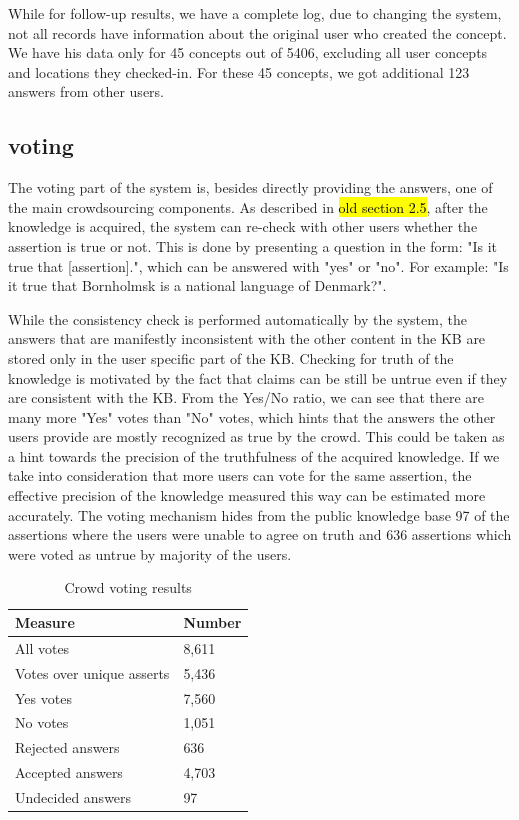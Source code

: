 {While for follow-up results, we have a complete log, due to changing the 
system, not all records have information about the original user who created 
the concept. We have his data only for 45 concepts out of 5406, excluding all 
user concepts and locations they checked-in. For these 45 concepts, 
we got additional 123 answers from other users.

\subsection{voting}
\label{section:resultsvoting}
The voting part of the system is, besides directly providing the answers, 
one of the main crowdsourcing components. As described in \hl{old section 2.5}, 
after the knowledge is acquired, the system can re-check with other users 
whether the assertion is true or not. This is done by presenting a question in 
the form: "Is it true that [assertion].", which can be answered with "yes" or 
"no". For example: "Is it true that Bornholmsk is a national language of 
Denmark?".

While the consistency check is performed automatically by the system, the 
answers that are manifestly inconsistent with the other content in the KB are 
stored only in the user specific part of the KB. Checking for truth of the 
knowledge is motivated by the fact that claims can be still be untrue even if 
they are consistent with the KB. From the Yes/No ratio, we can see that there 
are many more "Yes" votes than "No" votes, which hints that the answers the 
other users provide are mostly recognized as true by the crowd. 
This could be taken as a hint towards the precision of the truthfulness of the 
acquired knowledge. If we take into consideration that more users can vote for 
the same assertion, the effective precision of the knowledge measured this way 
can be estimated more accurately. The voting mechanism hides from the public 
knowledge base 97 of the assertions where the users were unable to agree on 
truth and 636 assertions which were voted as untrue by majority of the users.

\begin{table}[h]
\centering
\caption{Crowd voting results}
\label{tab:votingresults}
\begin{tabular}{|l|l|}
	\hline
	\textbf{Measure}  & \textbf{Number} \\
    \hline
    All votes & 8,611 \\
    \hline
    Votes over unique asserts & 5,436 \\
    \hline
    Yes votes & 7,560 \\
    \hline
    No votes & 1,051 \\
    \hline
    Rejected answers & 636 \\
    \hline
    Accepted answers & 4,703 \\
    \hline
    Undecided answers & 97 \\
    \hline
\end{tabular}
\end{table}

}
